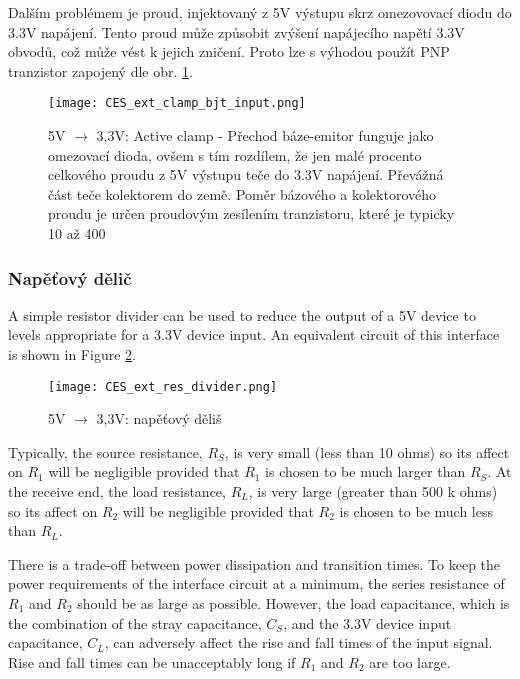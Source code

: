 {        Dalším problémem je proud, injektovaný z 5V výstupu skrz omezovovací diodu do 3.3V
        napájení. Tento proud může způsobit zvýšení napájecího napětí 3.3V obvodů, což může vést k
        jejich zničení. Proto lze s výhodou použít PNP tranzistor zapojený dle obr.
        \ref{CES:fig_bjt_clamp}.
        
        \begin{figure}[ht!]
          \centering
          \texttt{[image: CES\_ext\_clamp\_bjt\_input.png]}
          \caption{5V $\rightarrow$ 3,3V: Active clamp - Přechod báze-emitor funguje jako omezovací
                   dioda, ovšem s tím rozdílem, že jen malé procento celkového proudu z 5V výstupu
                   teče do 3.3V napájení. Převážná část teče kolektorem do země. Poměr bázového a
                   kolektorového proudu je určen proudovým zesílením tranzistoru, které je typicky
                  10 až 400}
          \label{CES:fig_bjt_clamp}
        \end{figure}              
       
      \subsubsection{Napěťový dělič} %
        A simple resistor divider can be used to reduce the output of a 5V device to levels
        appropriate for a 3.3V device input. An equivalent circuit of this interface is shown in
        Figure \ref{CES:fig_res_divider}.
        \begin{figure}[ht!]
          \centering
          \texttt{[image: CES\_ext\_res\_divider.png]}
          \caption{5V $\rightarrow$ 3,3V: napěťový děliš}
          \label{CES:fig_res_divider}
        \end{figure}
        Typically, the source resistance, $R_S$, is very small (less than 10 ohms) so its affect on
        $R_1$ will be negligible provided that $R_1$ is chosen to be much larger than $R_S$. At the
        receive end, the load resistance, $R_L$, is very large (greater than 500 k ohms) so its
        affect on $R_2$ will be negligible provided that $R_2$ is chosen to be much less than
        $R_L$.
        
        There is a trade-off between power dissipation and transition times. To keep the power
        requirements of the interface circuit at a minimum, the series resistance of $R_1$ and
        $R_2$ should be as large as possible. However, the load capacitance, which is the
        combination of the stray capacitance, $C_S$, and the 3.3V device input capacitance, $C_L$,
        can adversely affect the rise and fall times of the input signal. Rise and fall times can
        be unacceptably long if $R_1$ and $R_2$ are too large.
        
}

